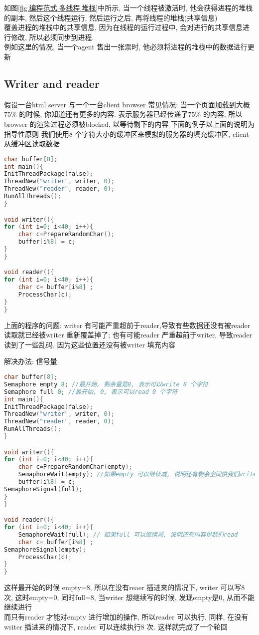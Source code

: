 \documentclass{article}
\begin{document}
如图\ref{fig.编程范式.多线程.堆栈}中所示, 当一个线程被激活时, 他会获得进程的堆栈的副本, 然后这个线程运行, 然后运行之后, 再将线程的堆栈(共享信息)\\覆盖进程的堆栈中的共享信息, 因为在线程的运行过程中, 会对进行的共享信息进行修改, 所以必须同步到进程.\\
例如这里的情况, 当一个agent 售出一张票时, 他必须将进程的堆栈中的数据进行更新\\

\subsection{Writer and reader}
假设一台html server 与一个一台client browser
常见情况: 当一个页面加载到大概75\% 的时候, 你知道还有更多的内容. 表示服务器已经传递了75\% 的内容, 所以browser 的渲染过程必须被blocked, 以等待剩下的内容
下面的例子以上面的说明为指导性原则
我们使用8 个字符大小的缓冲区来模拟的服务器的填充缓冲区, client 从缓冲区读取数据

\begin{lstlisting}[language = C]
char buffer[8];
int main(){
InitThreadPackage(false);
ThreadNew("writer", writer, 0);
ThreadNew("reader", reader, 0);
RunAllThreads();
}

void writer(){
for (int i=0; i<40; i++){
	char c=PrepareRandomChar();
	buffer[i%8] = c;
}
}

void reader(){
for (int i=0; i<40; i++){
	char c= buffer[i%8] ;
	ProcessChar(c);
}
}
\end{lstlisting}
上面的程序的问题: writer 有可能严重超前于reader,导致有些数据还没有被reader 读取就已经被writer 重新覆盖掉了; 也有可能reader 严重超前于writer, 导致reader 读到了一些乱码, 因为这些位置还没有被writer 填充内容

解决办法: 信号量

\begin{lstlisting}[language = C]
char buffer[8];
Semaphore empty 8; //最开始, 剩余量是8, 表示可以write 8 个字符
Semaphore full 0; //最开始, 0, 表示可以read 0 个字符
int main(){
InitThreadPackage(false);
ThreadNew("writer", writer, 0);
ThreadNew("reader", reader, 0);
RunAllThreads();
}

void writer(){
for (int i=0; i<40; i++){
	char c=PrepareRandomChar(empty);
	SemaphoreWait(empty); //如果empty 可以继续减, 说明还有剩余空间供我们write
	buffer[i%8] = c;
SemaphoreSignal(full);
}
}

void reader(){
for (int i=0; i<40; i++){
	SemaphoreWait(full); // 如果full 可以继续减, 说明还有内容供我们read
	char c= buffer[i%8] ;
SemaphoreSignal(empty);
	ProcessChar(c);
}
}
\end{lstlisting}
这样最开始的时候 empty=8, 所以在没有reaer 插进来的情况下, writer 可以写8 次, 这时empty=0, 同时full=8, 当writer 想继续写的时候, 发现empty是0, 从而不能继续进行\\
而只有reader 才能对empty 进行增加的操作, 所以reader 可以执行, 同样, 在没有writer 插进来的情况下, reader 可以连续执行8 次. 这样就完成了一个轮回
\end{document}
